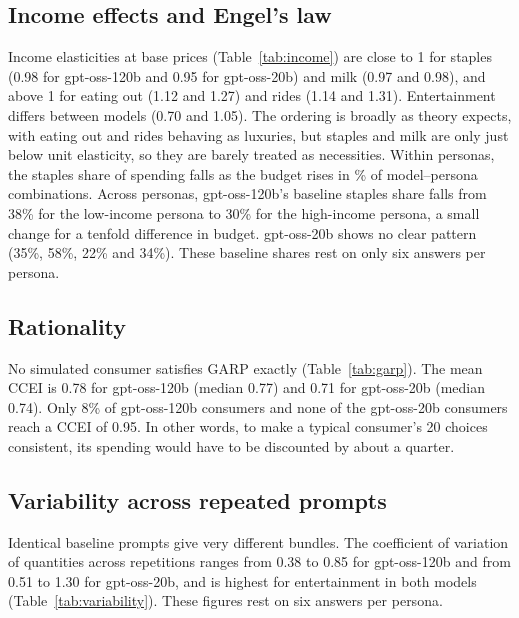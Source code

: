 \subsection{Income effects and Engel's law}
Income elasticities at base prices (Table~\ref{tab:income}) are close to 1 for staples (0.98 for gpt-oss-120b and 0.95 for gpt-oss-20b) and milk (0.97 and 0.98), and above 1 for eating out (1.12 and 1.27) and rides (1.14 and 1.31). Entertainment differs between models (0.70 and 1.05). The ordering is broadly as theory expects, with eating out and rides behaving as luxuries, but staples and milk are only just below unit elasticity, so they are barely treated as necessities. Within personas, the staples share of spending falls as the budget rises in \EngelHold\% of model--persona combinations. Across personas, gpt-oss-120b's baseline staples share falls from 38\% for the low-income persona to 30\% for the high-income persona, a small change for a tenfold difference in budget. gpt-oss-20b shows no clear pattern (35\%, 58\%, 22\% and 34\%). These baseline shares rest on only six answers per persona.

\subsection{Rationality}
No simulated consumer satisfies GARP exactly (Table~\ref{tab:garp}). The mean CCEI is 0.78 for gpt-oss-120b (median 0.77) and 0.71 for gpt-oss-20b (median 0.74). Only 8\% of gpt-oss-120b consumers and none of the gpt-oss-20b consumers reach a CCEI of 0.95. In other words, to make a typical consumer's 20 choices consistent, its spending would have to be discounted by about a quarter. 

\subsection{Variability across repeated prompts}
Identical baseline prompts give very different bundles. The coefficient of variation of quantities across repetitions ranges from 0.38 to 0.85 for gpt-oss-120b and from 0.51 to 1.30 for gpt-oss-20b, and is highest for entertainment in both models (Table~\ref{tab:variability}). These figures rest on six answers per persona.

